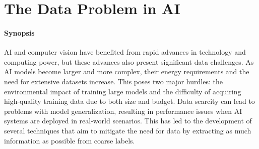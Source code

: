 \graphicspath{{ch1_introduction/}{Figures/}}

\chapter{The Data Problem in AI}
\label{chapter:introduction}







\subsubsection{Synopsis}AI and computer vision have benefited from rapid advances in technology and computing power, but these advances also present significant data challenges. As AI models become larger and more complex, their energy requirements and the need for extensive datasets increase. This poses two major hurdles: the environmental impact of training large models and the difficulty of acquiring high-quality training data due to both size and budget. Data scarcity can lead to problems with model generalization, resulting in performance issues when AI systems are deployed in real-world scenarios. This has led to the development of several techniques that aim to mitigate the need for data by extracting as much information as possible from coarse labels.





